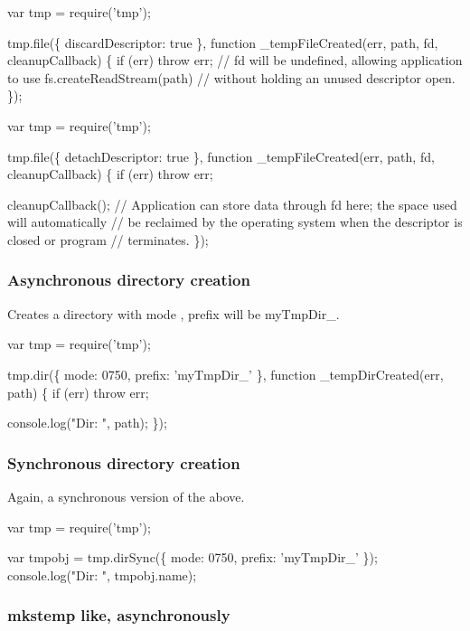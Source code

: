 \begin{DoxyCode}
var tmp = require('tmp');

tmp.file(\{ discardDescriptor: true \}, function \_tempFileCreated(err, path, fd, cleanupCallback) \{
  if (err) throw err;
  // fd will be undefined, allowing application to use fs.createReadStream(path)
  // without holding an unused descriptor open.
\});
\end{DoxyCode}



\begin{DoxyCode}
var tmp = require('tmp');

tmp.file(\{ detachDescriptor: true \}, function \_tempFileCreated(err, path, fd, cleanupCallback) \{
  if (err) throw err;

  cleanupCallback();
  // Application can store data through fd here; the space used will automatically
  // be reclaimed by the operating system when the descriptor is closed or program
  // terminates.
\});
\end{DoxyCode}


\subsubsection*{Asynchronous directory creation}

Creates a directory with mode {}, prefix will be {\ttfamily my\+Tmp\+Dir\+\_\+}.


\begin{DoxyCode}
var tmp = require('tmp');

tmp.dir(\{ mode: 0750, prefix: 'myTmpDir\_' \}, function \_tempDirCreated(err, path) \{
  if (err) throw err;

  console.log("Dir: ", path);
\});
\end{DoxyCode}


\subsubsection*{Synchronous directory creation}

Again, a synchronous version of the above.


\begin{DoxyCode}
var tmp = require('tmp');

var tmpobj = tmp.dirSync(\{ mode: 0750, prefix: 'myTmpDir\_' \});
console.log("Dir: ", tmpobj.name);
\end{DoxyCode}


\subsubsection*{mkstemp like, asynchronously}


